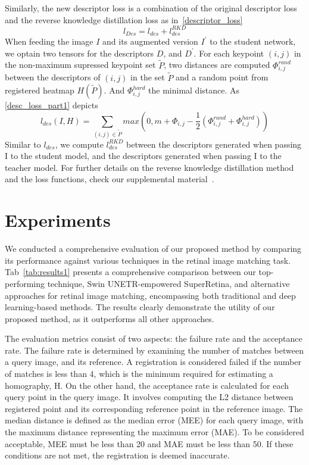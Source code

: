 \documentclass[10pt,twocolumn,letterpaper]{article}
\begin{document}
Similarly, the new descriptor loss is a combination of the original descriptor loss and the reverse knowledge distillation loss as in~\ref{descriptor_loss}
\begin{equation}\label{descriptor_loss}
    l_{Des} = l_{des} + l_{des}^{RKD} 
\end{equation}
When feeding the image $ I $ and its augmented version $ I^{'} $ to the student network, we optain two tensors for the descriptors $ D $, and $ D^{'} $. For each keypoint $ (i,j) $ in the non-maximum supressed keypoint set $ \tilde{P} $, two distances are computed $ \Phi_{i,j}^{rand} $ between the descriptors of $ (i,j) $ in the set $ \tilde{P} $ and a random point from registered heatmap $H(\tilde{P})$. And $\Phi_{i,j}^{hard}$ the minimal distance. As \ref{desc_loss_part1} depicts
\begin{equation}\label{desc_loss_part1}
    l_{des}(I,H) = \sum_{(i,j)\in \tilde{P}}max(0,m+\Phi_{i,j}-\frac{1}{2}(\Phi_{i,j}^{rand}+\Phi_{i,j}^{hard}))   
\end{equation}
Similar to $l_{des}$, we compute $l_{des}^{RKD}$ between the descriptors generated when passing I to the student model, and the descriptors generated when passing I to the teacher model. For further details on the reverse knowledge distillation method and the loss functions, check our supplemental material~\cite{Authors14}.




\section{Experiments}
\label{sec:experiments}
We conducted a comprehensive evaluation of our proposed method by comparing its performance against various techniques in the retinal image matching task. Tab~\ref{tab:results1} presents a comprehensive comparison between our top-performing technique, Swin UNETR-empowered SuperRetina, and alternative approaches for retinal image matching, encompassing both traditional and deep learning-based methods. The results clearly demonstrate the utility of our proposed method, as it outperforms all other approaches.

The evaluation metrics consist of two aspects: the failure rate and the acceptance rate. The failure rate is determined by examining the number of matches between a query image, and its reference. A registration is considered failed if the number of matches is less than 4, which is the minimum required for estimating a homography, H. On the other hand, the acceptance rate is calculated for each query point in the query image. It involves computing the L2 distance between registered point and its corresponding reference point in the reference image. The median distance is defined as the median error (MEE) for each query image, with the maximum distance representing the maximum error (MAE). To be considered acceptable, MEE must be less than 20 and MAE must be less than 50. If these conditions are not met, the registration is deemed inaccurate. 
\end{document}
